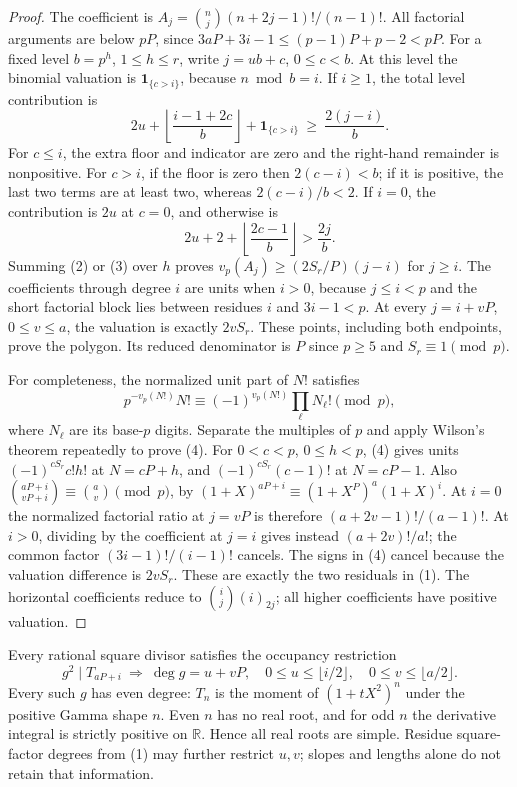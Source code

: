 \documentclass[11pt]{article}
\begin{document}
\begin{proof}
The coefficient is
$A_j=\binom nj(n+2j-1)!/(n-1)!$.
All factorial arguments are below $pP$, since
$3aP+3i-1\le(p-1)P+p-2<pP$.
For a fixed level $b=p^h$, $1\le h\le r$, write $j=ub+c$,
$0\le c<b$. At this level the binomial valuation is
$\mathbf1_{\{c>i\}}$, because $n\bmod b=i$.
If $i\ge1$, the total level contribution is
\[
 2u+\left\lfloor\frac{i-1+2c}{b}\right\rfloor
                         +\mathbf1_{\{c>i\}}
                 \ \ge\ \frac{2(j-i)}b.                       \tag{2}
\]
For $c\le i$, the extra floor and indicator are zero and the right-hand
remainder is nonpositive. For $c>i$, if the floor is zero then
$2(c-i)<b$; if it is positive, the last two terms are at least two,
whereas $2(c-i)/b<2$.
If $i=0$, the contribution is $2u$ at $c=0$, and otherwise is
\[
             2u+2+\left\lfloor\frac{2c-1}b\right\rfloor
                              >\frac{2j}b.                    \tag{3}
\]
Summing (2) or (3) over $h$ proves
$v_p(A_j)\ge(2S_r/P)(j-i)$ for $j\ge i$.
The coefficients through degree $i$ are units when $i>0$, because
$j\le i<p$ and the short factorial block lies between residues $i$ and
$3i-1<p$. At every $j=i+vP$, $0\le v\le a$, the valuation is exactly
$2vS_r$. These points, including both endpoints, prove the polygon.
Its reduced denominator is $P$ since $p\ge5$ and $S_r\equiv1\pmod p$.

For completeness, the normalized unit part of $N!$ satisfies
\[
 p^{-v_p(N!)}N!\equiv(-1)^{v_p(N!)}\prod_\ell N_\ell!\pmod p,
                                                               \tag{4}
\]
where $N_\ell$ are its base-$p$ digits. Separate the multiples of $p$
and apply Wilson's theorem repeatedly to prove (4).
For $0<c<p$, $0\le h<p$, (4) gives units
$(-1)^{cS_r}c!h!$ at $N=cP+h$, and
$(-1)^{cS_r}(c-1)!$ at $N=cP-1$.
Also $\binom{aP+i}{vP+i}\equiv\binom av\pmod p$, by
$(1+X)^{aP+i}\equiv(1+X^P)^a(1+X)^i$.
At $i=0$ the normalized factorial ratio at $j=vP$ is therefore
$(a+2v-1)!/(a-1)!$.
At $i>0$, dividing by the coefficient at $j=i$ gives instead
$(a+2v)!/a!$; the common factor $(3i-1)!/(i-1)!$ cancels.
The signs in (4) cancel because the valuation difference is $2vS_r$.
These are exactly the two residuals in (1).
The horizontal coefficients reduce to
$\binom ij(i)_{2j}$; all higher coefficients have positive valuation.
\end{proof}

Every rational square divisor satisfies the occupancy restriction
\[
 g^2\mid T_{aP+i}\ \Longrightarrow\
 \deg g=u+vP,\quad0\le u\le\lfloor i/2\rfloor,
                       \quad0\le v\le\lfloor a/2\rfloor.       \tag{5}
\]
Every such $g$ has even degree: $T_n$ is the moment of
$(1+tX^2)^n$ under the positive Gamma shape $n$. Even $n$ has no real
root, and for odd $n$ the derivative integral is strictly positive on
$\mathbb R$. Hence all real roots are simple.
Residue square-factor degrees from (1) may further restrict $u,v$;
slopes and lengths alone do not retain that information.
\end{document}
